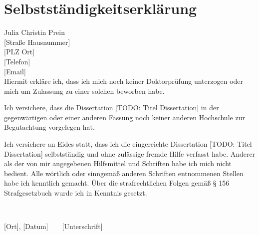 \documentclass[
]{scrbook}
\begin{document}
\chapter*{Selbstständigkeitserklärung}\label{selbststuxe4ndigkeitserkluxe4rung}

Julia Christin Prein\\
{[}Straße Hausnummer{]}\\
{[}PLZ Ort{]}\\
{[}Telefon{]}\\
{[}Email{]}\\

Hiermit erkläre ich, dass ich mich noch keiner Doktorprüfung unterzogen oder mich um Zulassung zu einer solchen beworben habe.

Ich versichere, dass die Dissertation {[}TODO: Titel Dissertation{]} in der gegenwärtigen oder einer anderen Fassung noch keiner anderen Hochschule zur Begutachtung vorgelegen hat.

Ich versichere an Eides statt, dass ich die eingereichte Dissertation {[}TODO: Titel Dissertation{]} selbstständig und ohne zulässige fremde Hilfe verfasst habe. Anderer als der von mir angegebenen Hilfsmittel und Schriften habe ich mich nicht bedient. Alle wörtlich oder sinngemäß anderen Schriften entnommenen Stellen habe ich kenntlich gemacht. Über die strafrechtlichen Folgen gemäß § 156 Strafgesetzbuch wurde ich in Kenntnis gesetzt.

~

{[}Ort{]}, {[}Datum{]} ~ ~ {[}Unterschrift{]}
\end{document}
